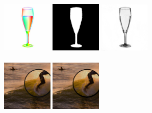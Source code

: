    \includegraphics[width=0.18\textwidth]{ch-tomnet/images/Synth/synthetic_63_shape_000000408989_fcolor.jpg}
    \includegraphics[width=0.18\textwidth]{ch-tomnet/images/Synth/synthetic_63_shape25__0000_COCO_val2014_000000408989_mask.png}
    \includegraphics[width=0.18\textwidth]{ch-tomnet/images/Synth/synthetic_63_shape25__0000_COCO_val2014_000000408989_rho.png}
    \\
    \\
    \includegraphics[width=0.18\textwidth]{ch-tomnet/images/Synth/synthetic_15_shape0000_COCO_val2014_000000449828_tar.jpg}
    \includegraphics[width=0.18\textwidth]{ch-tomnet/images/Synth/synthetic_15_shape0000_COCO_val2014_000000449828_pred.jpg}
